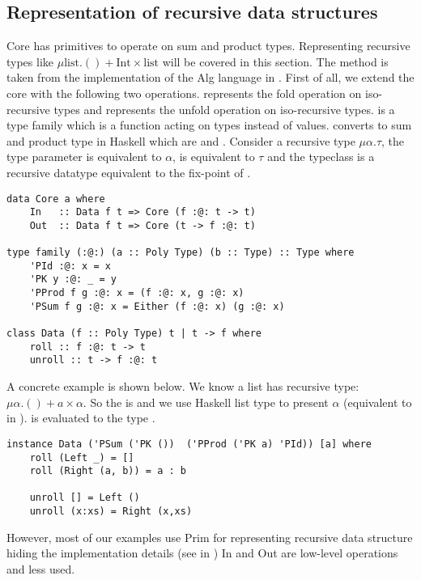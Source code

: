 \subsection{Representation of recursive data structures}
Core has primitives to operate on sum and product types. Representing recursive types like $\mu \text{list}. () + \text{Int} \times \text{list}$ will be covered in this section. The method is taken from the implementation of the Alg language in \cite{AlgebraicMultipartyProtocol}. First of all, we extend the core with the following two operations.  represents the fold operation on iso-recursive types and  represents the unfold operation on iso-recursive types.  is a type family which is a function acting on types instead of values.  converts  to sum and product type in Haskell which are \hask{(,)} and . Consider a recursive type $\mu \alpha. \tau$, the type parameter  is equivalent to $\alpha$,  is equivalent to $\tau$ and the typeclass  is a recursive datatype equivalent to the fix-point of .
\begin{verbatim}
data Core a where
    In   :: Data f t => Core (f :@: t -> t)
    Out  :: Data f t => Core (t -> f :@: t)

type family (:@:) (a :: Poly Type) (b :: Type) :: Type where
    'PId :@: x = x
    'PK y :@: _ = y
    'PProd f g :@: x = (f :@: x, g :@: x)
    'PSum f g :@: x = Either (f :@: x) (g :@: x)

class Data (f :: Poly Type) t | t -> f where
    roll :: f :@: t -> t
    unroll :: t -> f :@: t
\end{verbatim}
A concrete example is shown below. We know a list has recursive type: $\mu \alpha. () + a \times \alpha$. So the  is  and we use Haskell list type \hask{[a]} to present $\alpha$ (equivalent to  in  ).  is evaluated to the type .
\begin{verbatim}
instance Data ('PSum ('PK ())  ('PProd ('PK a) 'PId)) [a] where
    roll (Left _) = []
    roll (Right (a, b)) = a : b
  
    unroll [] = Left ()
    unroll (x:xs) = Right (x,xs)
\end{verbatim}

However, most of our examples use Prim for representing recursive data structure hiding the implementation details (see in ) In and Out are low-level operations and less used. %

